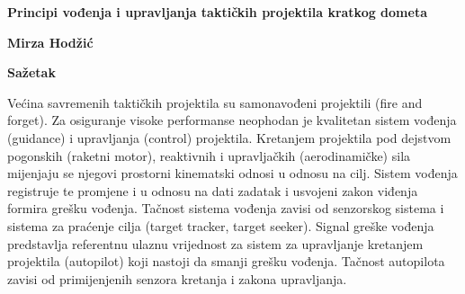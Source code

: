 \thispagestyle{plain}
\begin{center}
    \Large
    \textbf{Principi vođenja i upravljanja taktičkih projektila kratkog dometa}
    
    \vspace{0.4cm}
        
    \vspace{0.4cm}
    \textbf{Mirza Hodžić}
    
    \vspace{0.9cm}
    \textbf{Sažetak}
\end{center}

Većina savremenih taktičkih projektila su samonavođeni projektili (fire and forget). Za
osiguranje visoke performanse neophodan je kvalitetan sistem vođenja (guidance) i
upravljanja (control) projektila. Kretanjem projektila pod dejstvom pogonskih (raketni
motor), reaktivnih i upravljačkih (aerodinamičke) sila mijenjaju se njegovi prostorni
kinematski odnosi u odnosu na cilj. Sistem vođenja registruje te promjene i u odnosu na dati
zadatak i usvojeni zakon viđenja formira grešku vođenja. Tačnost sistema vođenja zavisi od
senzorskog sistema i sistema za praćenje cilja (target tracker, target seeker). Signal greške
vođenja predstavlja referentnu ulaznu vrijednost za sistem za upravljanje kretanjem projektila
(autopilot) koji nastoji da smanji grešku vođenja. Tačnost autopilota zavisi od primijenjenih
senzora kretanja i zakona upravljanja.